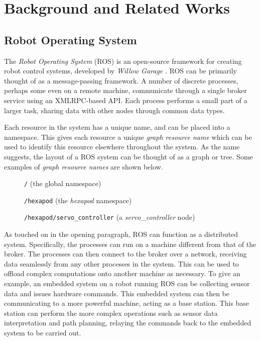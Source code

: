 \chapter{Background and Related Works}


\section{Robot Operating System}

The \emph{Robot Operating System} (ROS) is an open-source framework for creating robot control systems, developed by \emph{Willow Garage} \cite{ros_paper}. ROS can be primarily thought of as a message-passing framework. A number of discrete processes, perhaps some even on a remote machine, communicate through a single broker service using an XMLRPC-based API. Each process performs a small part of a larger task, sharing data with other nodes through common data types.

Each resource in the system has a unique name, and can be placed into a namespace. This gives each resource a unique \emph{graph resource name} which can be used to identify this resource elsewhere throughout the system. As the name suggests, the layout of a ROS system can be thought of as a graph or tree. Some examples of \emph{graph resource names} are shown below.

\begin{figure}[h]
    \centering

    \texttt{/} (the global namespace)

    \texttt{/hexapod} (the \emph{hexapod} namespace)

    \texttt{/hexapod/servo\_controller} (a \emph{servo\_controller} node)
\end{figure}

As touched on in the opening paragraph, ROS can function as a distributed system. Specifically, the processes can run on a machine different from that of the broker. The processes can then connect to the broker over a network, receiving data seamlessly from any other processes in the system. This can be used to offload complex computations onto another machine as necessary. To give an example, an embedded system on a robot running ROS can be collecting sensor data and issues hardware commands. This embedded system can then be communicating to a more powerful machine, acting as a base station. This base station can perform the more complex operations such as sensor data interpretation and path planning, relaying the commands back to the embedded system to be carried out.

